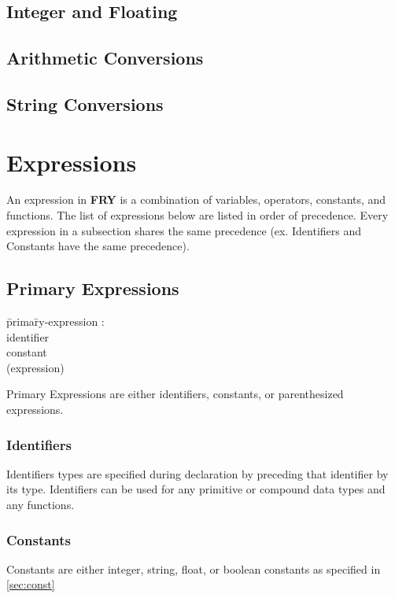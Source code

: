 \documentclass{article}
\begin{document}
\subsection{Integer and Floating}
\subsection{Arithmetic Conversions}
\subsection{String Conversions}


\section{Expressions}
An expression in \textbf{FRY} is a combination of variables, operators, constants, and functions. The list of expressions below are listed in order of precedence. Every expression in a subsection shares the same precedence (ex. Identifiers and Constants have the same precedence).
\subsection{Primary Expressions}
\begin{itshape}
\begin{tabbing}
	\= prima\=ry-expression : \\
		\>\> identifier \\
		\>\> constant \\ 
		\>\> (expression)
\end{tabbing}
\end{itshape}
Primary Expressions are either identifiers, constants, or parenthesized expressions. 
\subsubsection{Identifiers}
Identifiers types are specified during declaration by preceding that identifier by its type.  Identifiers can be used for any primitive or compound data types and any functions. 
\subsubsection{Constants}
Constants are either integer, string, float, or boolean constants as specified in \ref{sec:const}
\end{document}
